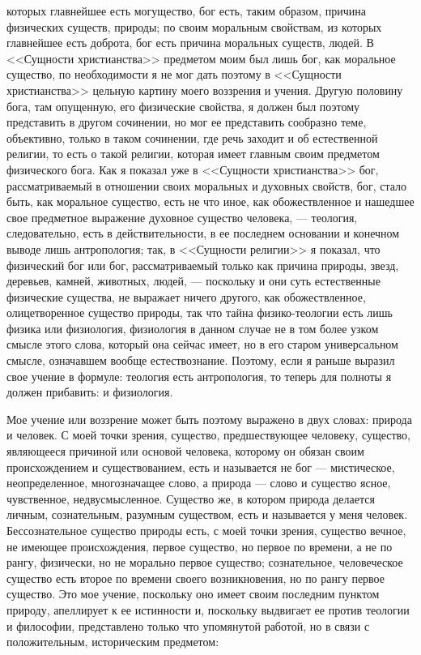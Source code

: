 \documentclass[12pt]{article}
\begin{document}
которых главнейшее есть могущество, бог есть, таким образом, причина физических существ, природы; по своим моральным свойствам, из которых главнейшее есть доброта, бог есть причина моральных существ, людей. В <<Сущности христианства>> предметом моим был лишь бог, как моральное существо, по необходимости я не мог дать поэтому в <<Сущности христианства>> цельную картину моего воззрения и учения. Другую половину бога, там опущенную, его физические свойства, я должен был поэтому представить в другом сочинении, но мог ее представить сообразно теме, объективно, только в таком сочинении, где речь заходит и об естественной религии, то есть о такой религии, которая имеет главным своим предметом физического бога. Как я показал уже в <<Сущности христианства>>  бог, рассматриваемый в отношении своих моральных и духовных свойств, бог, стало быть, как моральное существо, есть не что иное, как обожествленное и нашедшее свое предметное выражение духовное существо человека, --- теология, следовательно, есть в действительности, в ее последнем основании и конечном выводе лишь антропология; так, в <<Сущности религии>> я показал, что физический бог или бог, рассматриваемый только как причина природы, звезд, деревьев, камней, животных, людей, --- поскольку и они суть естественные физические существа, не выражает ничего другого, как обожествленное, олицетворенное существо природы, так что тайна физико-теологии есть лишь физика или физиология, физиология в данном случае не в том более узком смысле этого слова, который она сейчас имеет, но в его старом универсальном смысле, означавшем вообще естествознание. Поэтому, если я раньше выразил свое учение в формуле: теология есть антропология, то теперь для полноты я должен прибавить: и физиология. 

Мое учение или воззрение может быть поэтому выражено в двух словах: природа и человек. С моей точки зрения, существо, предшествующее человеку, существо, являющееся причиной или основой человека, которому он обязан своим происхождением и существованием, есть и называется не бог --- мистическое, неопределенное, многозначащее слово, а природа --- слово и существо ясное, чувственное, недвусмысленное. Существо же, в котором природа делается личным, сознательным, разумным существом, есть и называется у меня человек. Бессознательное существо природы есть, с моей точки зрения, существо вечное, не имеющее происхождения, первое существо, но первое по времени, а не по рангу, физически, но не морально первое существо; сознательное, человеческое существо есть второе по времени своего возникновения, но по рангу первое существо. Это мое учение, поскольку оно имеет своим последним пунктом природу, апеллирует к ее истинности и, поскольку выдвигает ее против теологии и философии, представлено только что упомянутой работой, но в связи с положительным, историческим предметом: 
\end{document}
